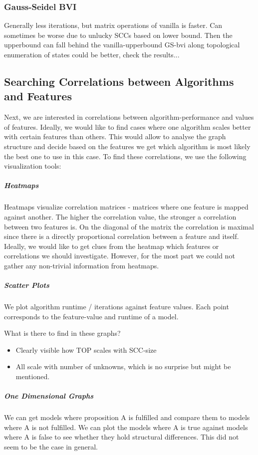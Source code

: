 \subsubsection*{Gauss-Seidel BVI}
Generally less iterations, but matrix operations of vanilla is faster.
Can sometimes be worse due to unlucky SCCs based on lower bound. Then the upperbound can fall behind the vanilla-upperbound
GS-bvi along topological enumeration of states could be better, check the results...

\subsection{Searching Correlations between Algorithms and Features}
Next, we are interested in  correlations between algorithm-performance and values of features.
Ideally, we would like to find cases where one algorithm scales better with certain features than others.
This would allow to analyse the graph structure and decide based on the features we get which algorithm is most likely the best one to use in this case.
To find these correlations, we use the following visualization tools:

\subparagraph*{Heatmaps}
Heatmaps visualize correlation matrices - matrices where one feature is mapped against another. The higher the correlation value, the stronger
a correlation between two features is. On the diagonal of the matrix the correlation is maximal since there is a directly proportional correlation between
a feature and itself. Ideally, we would like to get clues from the heatmap which features or correlations we should investigate.
However, for the most part we could not gather any non-trivial information from heatmaps.

\subparagraph*{Scatter Plots}
We plot algorithm runtime / iterations against feature values. Each point corresponds to the feature-value and runtime of a model.

What is there to find in these graphs?
\begin{itemize}
    \item Clearly visible how TOP scales with SCC-size
    \item All scale with number of unknowns, which is no surprise but might be mentioned.
\end{itemize}

\subparagraph*{One Dimensional Graphs}
We can get models where proposition A is fulfilled and compare them to models where A is not fulfilled.
We can plot the models where A is true against models where A is false to see whether they hold structural differences.
This did not seem to be the case in general.